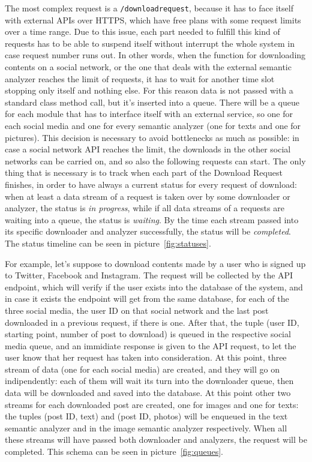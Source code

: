 The most complex request is a \texttt{/downloadrequest}, because it has to face itself with external APIs over HTTPS, which have free plans with some request limits over a time range. Due to this issue, each part needed to fulfill this kind of requests has to be able to suspend itself without interrupt the whole system in case request number runs out. In other words, when the function for downloading contents on a social network, or the one that deals with the external semantic analyzer reaches the limit of requests, it has to wait for another time slot stopping only itself and nothing else. For this reason data is not passed with a standard class method call, but it's inserted into a queue. There will be a queue for each module that has to interface itself with an external service, so one for each social media and one for every semantic analyzer (one for texts and one for pictures). This decision is necessary to avoid bottlenecks as much as possible: in case a social network API reaches the limit, the downloads in the other social networks can be carried on, and so also the following requests can start. The only thing that is necessary is to track when each part of the Download Request finishes, in order to have always a current status for every request of download: when at least a data stream of a request is taken over by some downloader or analyzer, the status is \textit{in progress}, while if all data streams of a requests are waiting into a queue, the status is \textit{waiting}. By the time each stream passed into its specific downloader and analyzer successfully, the status will be \textit{completed}. The status timeline can be seen in picture~\ref{fig:statuses}.

For example, let's suppose to download contents made by a user who is signed up to Twitter, Facebook and Instagram. The request will be collected by the API endpoint, which will verify if the user exists into the database of the system, and in case it exists the endpoint will get from the same database, for each of the three social media, the user ID on that social network and the last post downloaded in a previous request, if there is one. After that, the tuple (user ID, starting point, number of post to download) is queued in the respective social media queue, and an immidiate response is given to the API request, to let the user know that her request has taken into consideration. At this point, three stream of data (one for each social media) are created, and they will go on indipendently: each of them will wait its turn into the downloader queue, then data will be downloaded and saved into the database. At this point other two streams for each downloaded post are created, one for images and one for texts: the tuples (post ID, text) and (post ID, photos) will be enqueued in the text semantic analyzer and in the image semantic analyzer respectively. When all these streams will have passed both downloader and analyzers, the request will be completed. This schema can be seen in picture~\ref{fig:queues}.

